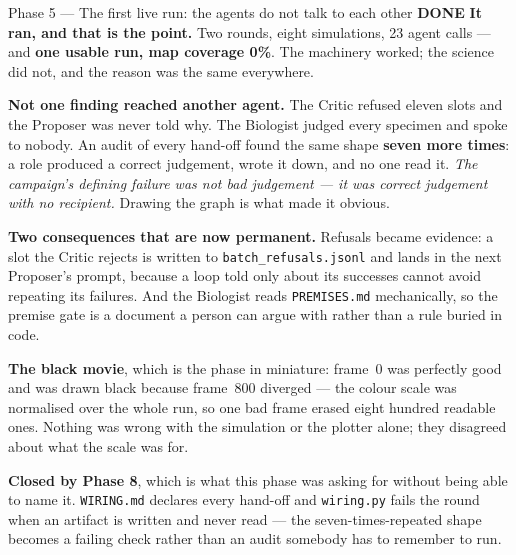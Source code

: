 \documentclass[11pt,a4paper]{article}
\newcommand{\code}[1]{\texttt{#1}}
\newcommand{\done}{\textcolor{good}{\textbf{DONE}}}
\begin{document}
\begin{phasebox}{Phase 5 --- The first live run: the agents do not talk to each other \hfill \done}
\textbf{It ran, and that is the point.} Two rounds, eight simulations, 23 agent calls --- and
\textbf{one usable run, map coverage 0\%}. The machinery worked; the science did not, and the
reason was the same everywhere.

\textbf{Not one finding reached another agent.} The Critic refused eleven slots and the Proposer
was never told why. The Biologist judged every specimen and spoke to nobody. An audit of every
hand-off found the same shape \textbf{seven more times}: a role produced a correct judgement, wrote
it down, and no one read it. \emph{The campaign's defining failure was not bad judgement --- it was
correct judgement with no recipient.} Drawing the graph is what made it obvious.

\textbf{Two consequences that are now permanent.} Refusals became evidence: a slot the Critic
rejects is written to \code{batch\_refusals.jsonl} and lands in the next Proposer's prompt, because
a loop told only about its successes cannot avoid repeating its failures. And the Biologist reads
\code{PREMISES.md} mechanically, so the premise gate is a document a person can argue with rather
than a rule buried in code.

\textbf{The black movie}, which is the phase in miniature: frame~0 was perfectly good and was drawn
black because frame~800 diverged --- the colour scale was normalised over the whole run, so one bad
frame erased eight hundred readable ones. Nothing was wrong with the simulation or the plotter
alone; they disagreed about what the scale was for.

\textbf{Closed by Phase 8}, which is what this phase was asking for without being able to name it.
\code{WIRING.md} declares every hand-off and \code{wiring.py} fails the round when an artifact is
written and never read --- the seven-times-repeated shape becomes a failing check rather than an
audit somebody has to remember to run.
\end{phasebox}
\end{document}
